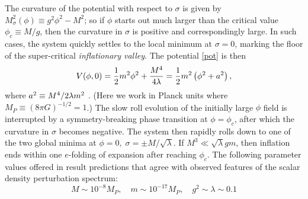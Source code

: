 The curvature of the potential with respect to $\sigma$ is given by $M_\sigma^2(\phi) \equiv g^2\phi^2 - M^2$; so if $\phi$ starts out much larger than the critical value $\phi_c \equiv M/g$, then the curvature in $\sigma$ is positive and correspondingly large.  In such cases, the system quickly settles to the local minimum at $\sigma = 0$, marking the floor of the super-critical {\it inflationary valley}.  
The potential \eqref{pot} is then
\begin{equation} V(\phi,0) = \frac12 m^2 \phi^2 + \frac{M^4}{4\lambda} = \frac12 m^2 \left( \phi^2 + a^2 \right), \label{valley} \end{equation}
where $a^2 \equiv M^4/2\lambda m^2$ .
(Here we work in Planck units where $M_P \equiv (8\pi G)^{-1/2} = 1$.)
The slow roll evolution of the initially large $\phi$ field is interrupted by a symmetry-breaking phase transition at $\phi = \phi_c$, after which the curvature in $\sigma$ becomes negative.  
The system then rapidly rolls down to one of the two global minima at $\phi=0,\;\sigma=\pm M/\sqrt{\lambda}$.  If $ M^3 \ll \sqrt{\lambda} g m$, then inflation ends within one $e$-folding of expansion after reaching $\phi_c$.
The following parameter values offered in \cite{linde1994hybrid} result predictions that agree with observed features of the scalar density perturbation spectrum: 
\[ M \sim 10^{-8} M_P, \quad m \sim 10^{-17} M_P, \quad g^2 \sim \lambda \sim 0.1 \]




